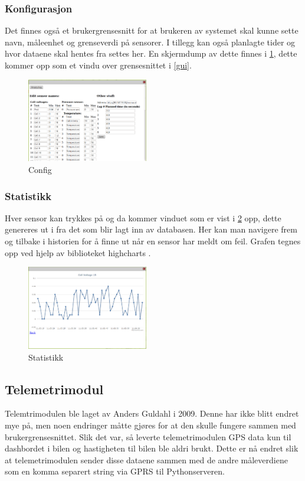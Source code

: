 \subsubsection{Konfigurasjon}
Det finnes også et brukergrensesnitt for at brukeren av systemet skal kunne sette navn, måleenhet og grenseverdi på sensorer. I tillegg kan også planlagte tider og hvor dataene skal hentes fra settes her.
En skjermdump av dette finnes i \ref{config}, dette kommer opp som et vindu over grensesnittet i \ref{gui}.
\begin{figure}[H]
\caption{Config} 
\label{config}
\includegraphics[width=200px]{images/config.png}
\end{figure}

\subsubsection{Statistikk}
Hver sensor kan trykkes på og da kommer vinduet som er vist i \ref{stats} opp, dette genereres ut i fra det som blir lagt inn av databasen. Her kan man navigere frem og tilbake i historien for å finne ut når en sensor har meldt om feil. Grafen tegnes opp ved hjelp av biblioteket highcharts \cite{highcharts}.
\begin{figure}[H]
\caption{Statistikk} 
\label{stats}
\includegraphics[width=200px]{images/stat.png}
\end{figure}
\subsection{Telemetrimodul}
Telemtrimodulen ble laget av Anders Guldahl \cite{telemetrithesis} i 2009. Denne har ikke blitt endret mye på, men noen endringer måtte gjøres for at den skulle fungere sammen med brukergrensesnittet.
Slik det var, så leverte telemetrimodulen GPS data kun til dashbordet i bilen og hastigheten til bilen ble aldri brukt. Dette er nå endret slik at telemetrimodulen sender disse dataene sammen med de andre måleverdiene som en komma separert string via GPRS til Pythonserveren.
